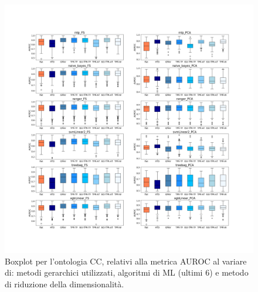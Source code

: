 \documentclass[12pt]{report}
\begin{document}
\begin{appendices}
\begin{figure}[h]
 \hspace*{-2.6cm}
\includegraphics[scale=0.34]{./images/CC_AUC_2.png}
\caption{\footnotesize{Boxplot per l'ontologia CC, relativi alla metrica AUROC al variare di: metodi gerarchici utilizzati, algoritmi di ML (ultimi 6) e metodo di riduzione della dimensionalità.}}
\label{CC_AUC_2}
\end{figure}


\end{appendices}
\end{document}
